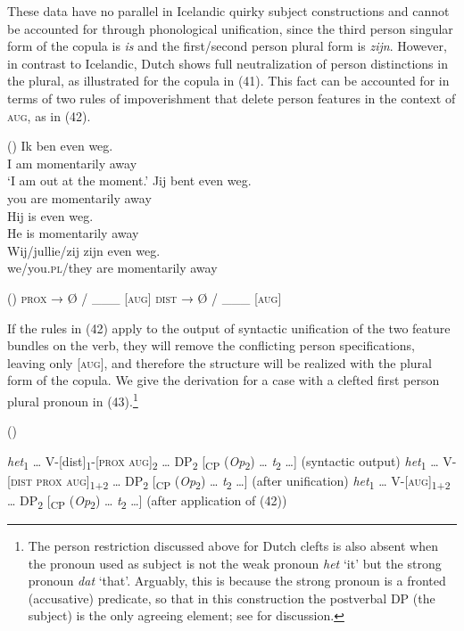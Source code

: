 \documentclass[output=paper]{langsci/langscibook}
\begin{document}
These data have no parallel in Icelandic quirky subject constructions and cannot be accounted for through phonological unification, since the third person singular form of the copula is \textit{is} and the first/second person plural form is \textit{zijn}. However, in contrast to Icelandic, Dutch shows full neutralization of person distinctions in the plural, as illustrated for the copula in (41). This fact can be accounted for in terms of two rules of impoverishment that delete person features in the context of \textsc{aug}, as in (42).

\ea (\label{bkm:Ref295574585})  
\ea \gll Ik ben even              weg.\\
    I   am  momentarily away\\
\glt ‘I am out at the moment.’
\ex \gll Jij   bent even              weg.\\
    you are   momentarily away\\
\ex \gll  Hij is even             weg.\\
He is momentarily away\\
\ex \gll  Wij/jullie/zij     zijn even              weg.\\
    we/you.\textsc{pl}/they are   momentarily away\\
\z \z

\ea (\label{bkm:Ref328734023}\label{bkm:Ref295642138})  
\ea \textsc{prox} → Ø / \_\_\_ [\textsc{aug}]
\ex \textsc{dist} → Ø / \_\_\_ [\textsc{aug}]
\z
\z

If the rules in (42) apply to the output of syntactic unification of the two feature bundles on the verb, they will remove the conflicting person specifications, leaving only [\textsc{aug}], and therefore the structure will be realized with the plural form of the copula. We give the derivation for a case with a clefted first person plural pronoun in (43).\footnote{The person restriction discussed above for Dutch clefts is also absent when the pronoun used as subject is not the weak pronoun \textit{het} ‘it’ but the strong pronoun \textit{dat} ‘that’. Arguably, this is because the strong pronoun is a fronted (accusative) predicate, so that in this construction the postverbal DP (the subject) is the only agreeing element; see \citet{Ackema2018} for discussion.}

\ea (\label{bkm:Ref295575416})  

\ea \textit{het}\textsubscript{1} … V-[dist]\textsubscript{1}{}-[\textsc{prox} \textsc{aug}]\textsubscript{2} … DP\textsubscript{2} [\textsubscript{CP} (\textit{Op}\textsubscript{2}) … \textit{t}\textsubscript{2} …]   (syntactic output)
\ex \textit{het}\textsubscript{1} … V-[\textsc{dist prox} \textsc{aug}]\textsubscript{1+2} … DP\textsubscript{2} [\textsubscript{CP} (\textit{Op}\textsubscript{2}) … \textit{t}\textsubscript{2} …]   (after unification)
\ex  \textit{het}\textsubscript{1} … V-[\textsc{aug}]\textsubscript{1+2} … DP\textsubscript{2} [\textsubscript{CP} (\textit{Op}\textsubscript{2}) … \textit{t}\textsubscript{2} …]     (after application of (42))
\z \z
\end{document}
